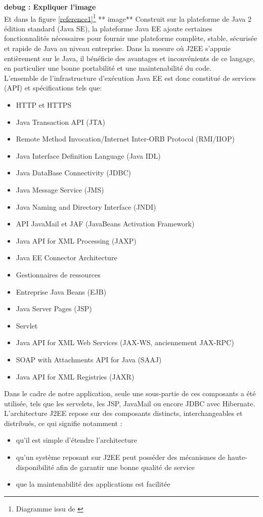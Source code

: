 \textbf{debug : Expliquer l'image}\\
Et dans la figure  \ref{reference1}\footnote{Diagramme issu de \url{}}
** image**
Construit sur la plateforme de Java 2 édition standard (Java SE), la plateforme Java EE ajoute certaines fonctionnalités nécessaires pour fournir une plateforme complète, stable, sécurisée et rapide de Java au niveau entreprise. 
Dans la mesure où J2EE s'appuie entièrement sur le Java, il bénéficie des avantages et inconvénients de ce langage, en particulier une bonne portabilité et une maintenabilité du code.\\
\newline
\indent
L'ensemble de l'infrastructure d'exécution Java EE est donc constitué de services (API) et spécifications tels que:
\begin{itemize}
\item HTTP et HTTPS
\item Java Transaction API (JTA)
\item Remote Method Invocation/Internet Inter-ORB Protocol (RMI/IIOP)
\item Java Interface Definition Language (Java IDL)
\item Java DataBase Connectivity (JDBC)
\item Java Message Service (JMS)
\item Java Naming and Directory Interface (JNDI)
\item API JavaMail et JAF (JavaBeans Activation Framework)
\item Java API for XML Processing (JAXP)
\item Java EE Connector Architecture
\item Gestionnaires de ressources
\item Entreprise Java Beans (EJB)
\item Java Server Pages (JSP)
\item Servlet
\item Java API for XML Web Services (JAX-WS, anciennement JAX-RPC)
\item SOAP with Attachments API for Java (SAAJ)
\item Java API for XML Registries (JAXR)\\
\end{itemize}
Dans le cadre de notre application, seule une sous-partie de ces composants a été utilisée, tels que les servelets, les JSP, JavaMail ou encore JDBC avec Hibernate.\\
\newline
\indent
L'architecture J2EE repose sur des composants distincts, interchangeables et distribués, ce qui signifie notamment :
\begin{itemize}
\item qu'il est simple d'étendre l'architecture 
\item qu'un système reposant sur J2EE peut posséder des mécanismes de haute-disponibilité afin de garantir une bonne qualité de service 
\item que la maintenabilité des applications est facilitée
\end{itemize}
\bigskip

